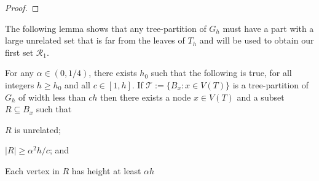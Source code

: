 \documentclass{patmorin}
\renewcommand{\le}{\leqslant}
\renewcommand{\ge}{\geqslant}
\begin{document}
\begin{proof}
\end{proof}

The following lemma shows that any tree-partition of $G_h$ must have a part with a large unrelated set that is far from the leaves of $T_h$ and will be used to obtain our first set $\mathcal{R}_1$.

\begin{lem}\label{startup}
  For any $\alpha\in(0,1/4)$, there exists $h_0$ such that the following is true, for all integers $h\ge  h_0$ and all $c\in[1,h]$.  If $\mathcal{T}:=\{B_x:x\in V(T)\}$ is a tree-partition of $G_h$ of width less than $ch$ then there exists a node $x\in V(T)$ and a subset $R\subseteq B_x$ such that
  \begin{compactenum}[(i)]
    \item $R$ is unrelated;
    \item $|R|\ge \alpha^2 h/c$; and
    \item Each vertex in $R$ has height at least $\alpha h$
  \end{compactenum}
\end{lem}
\end{document}
